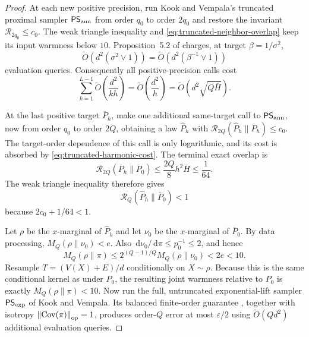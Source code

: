 \documentclass[11pt]{article}
\theoremstyle{remark}
\newcommand{\1}{\bm 1}
\newcommand{\eps}{\varepsilon}
\newcommand{\Cov}{\operatorname{Cov}}
\newcommand{\dd}{\,\mathrm d}
\newcommand{\norm}[1]{\left\lVert #1\right\rVert}
\begin{document}
\begin{proof}
At each new positive precision, run Kook and Vempala's truncated
proximal sampler $\mathsf{PS}_{\rm ann}$ from order $q_0$ to order
$2q_0$ and restore the invariant
$\mathcal R_{2q_0}\leq c_0$.  The weak triangle inequality and
\eqref{eq:truncated-neighbor-overlap} keep its input warmness below
$10$.  Proposition~5.2 of \citet{KV26zeroth} charges, at target
$\beta=1/\sigma^2$,
\begin{equation}\label{eq:truncated-phase-cost}
  \widetilde O\!\left(d^2(\sigma^2\vee1)\right)
  =\widetilde O\!\left(d^2(\beta^{-1}\vee1)\right)
\end{equation}
evaluation queries.  Consequently all positive-precision calls cost
\begin{equation}\label{eq:truncated-harmonic-cost}
  \sum_{k=1}^{L-1}\widetilde O\!\left(\frac{d^2}{kh}\right)
  =\widetilde O\!\left(\frac{d^2}{h}\right)
  =\widetilde O\!\left(d^2\sqrt{Q\overline H}\right).
\end{equation}

At the last positive target $\overline P_h$, make one additional
same-target call to $\mathsf{PS}_{\rm ann}$, now from order $q_0$ to
order $2Q$, obtaining a law $\widehat P_h$ with
$\mathcal R_{2Q}(\widehat P_h\|\overline P_h)\leq c_0$.  The target-order
dependence of this call is only logarithmic, and its cost is absorbed by
\eqref{eq:truncated-harmonic-cost}.  The terminal exact overlap is
\[
  \mathcal R_{2Q}(\overline P_h\|\overline P_0)
  \leq\frac{2Q}{8}h^2\overline H\leq\frac1{64}.
\]
The weak triangle inequality therefore gives
\begin{equation}\label{eq:full-lift-warm-input}
  \mathcal R_Q(\widehat P_h\|\overline P_0)<1
\end{equation}
because $2c_0+1/64<1$.

Let $\rho$ be the $x$-marginal of $\widehat P_h$ and let $\nu_0$ be the
$x$-marginal of $\overline P_0$.  By data processing,
$M_Q(\rho\|\nu_0)<e$.  Also
$\dd\nu_0/\dd\pi\leq p_0^{-1}\leq2$, and hence
\begin{equation}\label{eq:exact-target-warmness}
  M_Q(\rho\|\pi)
  \leq2^{(Q-1)/Q}M_Q(\rho\|\nu_0)<2e<10.
\end{equation}
Resample $T=(V(X)+E)/d$ conditionally on $X\sim\rho$.  Because this is
the same conditional kernel as under $P_0$, the resulting joint
warmness relative to $P_0$ is exactly $M_Q(\rho\|\pi)<10$.  Now run the
full, untruncated exponential-lift sampler $\mathsf{PS}_{\rm exp}$ of
Kook and Vempala.  Its balanced finite-order guarantee
\citep[Proposition~5.1]{KV26zeroth}, together with isotropy
$\norm{\Cov(\pi)}_{\rm op}=1$, produces order-$Q$ error at most
$\eps/2$ using $\widetilde O(Qd^2)$ additional evaluation queries.


\end{proof}
\end{document}
